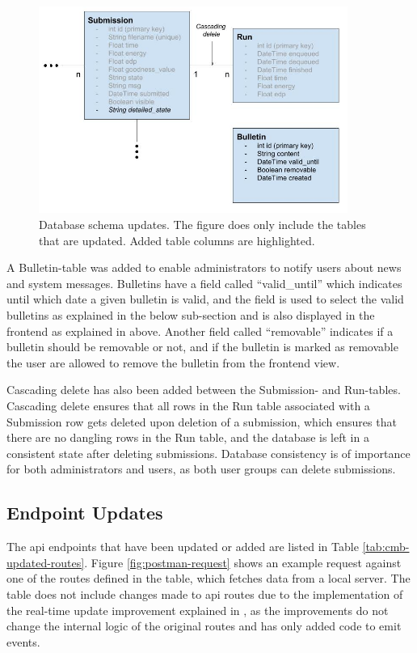 \begin{figure}
    \includegraphics[width=0.9\textwidth]{figs/updated_database_schema.jpg}
    \caption[Database schema updates]{Database schema updates. The figure does only include the tables that are updated. Added table columns are highlighted.}
    \label{fig:updated-database-schema}
\end{figure}

A Bulletin-table was added to enable administrators to notify users about news and system messages. Bulletins have a field called ``valid\_until'' which indicates until which date a given bulletin is valid, and the field is used to select the valid bulletins as explained in the below sub-section and is also displayed in the frontend as explained in  above. Another field called ``removable'' indicates if a bulletin should be removable or not, and if the bulletin is marked as removable the user are allowed to remove the bulletin from the frontend view.

Cascading delete has also been added between the Submission- and Run-tables. Cascading delete ensures that all rows in the Run table associated with a Submission row gets deleted upon deletion of a submission, which ensures that there are no dangling rows in the Run table, and the database is left in a consistent state after deleting submissions. Database consistency is of importance for both administrators and users, as both user groups can delete submissions.

\subsection{Endpoint Updates}
\label{sub-sec:impr-server-endpoint}
The \gls{api} endpoints that have been updated or added are listed in Table \ref{tab:cmb-updated-routes}. Figure \ref{fig:postman-request} shows an example request against one of the routes defined in the table, which fetches data from a local server. The table does not include changes made to \gls{api} routes due to the implementation of the real-time update improvement explained in , as the improvements do not change the internal logic of the original routes and has only added code to emit events. \\

